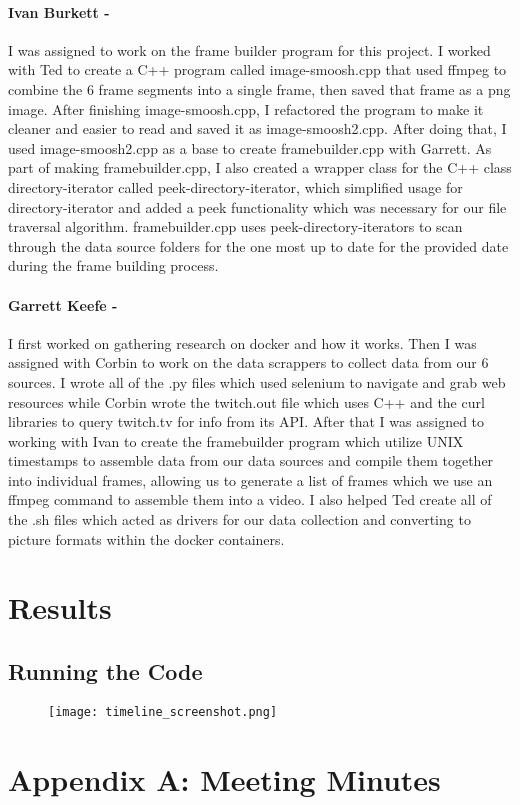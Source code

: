 \documentclass{article}
\begin{document}
    \paragraph{Ivan Burkett -}
    I was assigned to work on the frame builder program for this project. I worked with Ted to create a C++ program called image-smoosh.cpp that used ffmpeg to combine the 6 frame segments into a single frame, then saved that frame as a png image. After finishing image-smoosh.cpp, I refactored the program to make it cleaner and easier to read and saved it as image-smoosh2.cpp. After doing that, I used image-smoosh2.cpp as a base to create framebuilder.cpp with Garrett. As part of making framebuilder.cpp, I also created a wrapper class for the C++ class directory-iterator called peek-directory-iterator, which simplified usage for directory-iterator and added a peek functionality which was necessary for our file traversal algorithm. framebuilder.cpp uses peek-directory-iterators to scan through the data source folders for the one most up to date for the provided date during the frame building process.
    \paragraph{Garrett Keefe -}
    I first worked on gathering research on docker and how it works. Then I was assigned with Corbin to work on the data scrappers to collect data from our 6 sources. I wrote all of the .py files which used selenium to navigate and grab web resources while Corbin wrote the twitch.out file which uses C++ and the curl libraries to query twitch.tv for info from its API. After that I was assigned to working with Ivan to create the framebuilder program which utilize UNIX timestamps to assemble data from our data sources and compile them together into individual frames, allowing us to generate a list of frames which we use an ffmpeg command to assemble them into a video. I also helped Ted create all of the .sh files which acted as drivers for our data collection and converting to picture formats within the docker containers.
\section{Results}
  \subsection{Running the Code}
  \begin{figure}[h!]
    \texttt{[image: timeline\_screenshot.png]}
    \caption{}
    \label{}
  \end{figure}

\section{Appendix A: Meeting Minutes}
\end{document}
